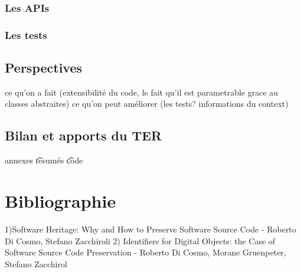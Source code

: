\documentclass[12pt,a4paper]{report}
\begin{document}
	\subsection{Les APIs}
	\subsection{Les tests}
	
	\section{Perspectives}
	ce qu'on a fait (extensibilité du code, le fait qu'il est parametrable grace au classes abstraites)
	ce qu'on peut améliorer (les tests? informations du context)
	\section{Bilan et apports du TER}	
annexes
\t resumés \t code	
\chapter*{Bibliographie}
1)Software Heritage: Why and How to Preserve Software Source Code - Roberto Di Cosmo, Stefano Zacchiroli
2) Identifiers for Digital Objects: the Case of Software Source Code Preservation - Roberto Di Cosmo, Morane Gruenpeter, Stefano Zacchirol
\end{document}
